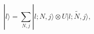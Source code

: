 \begin{equation}
 | l \rangle 
 = \sum_{N,j} | l; N, j \rangle
   \otimes U \widetilde {| l; N, j \rangle},
\end{equation}

